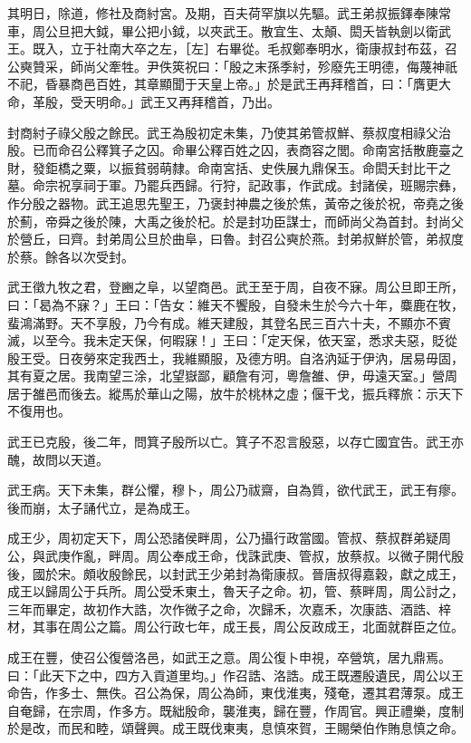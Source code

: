 \begin{pinyinscope}
其明日，除道，修社及商紂宮。及期，百夫荷罕旗以先驅。武王弟叔振鐸奉陳常車，周公旦把大鉞，畢公把小鉞，以夾武王。散宜生、太顛、閎夭皆執劍以衛武王。既入，立于社南大卒之左，［左］右畢從。毛叔鄭奉明水，衛康叔封布茲，召公奭贊采，師尚父牽牲。尹佚筴祝曰：「殷之末孫季紂，殄廢先王明德，侮蔑神祇不祀，昏暴商邑百姓，其章顯聞于天皇上帝。」於是武王再拜稽首，曰：「膺更大命，革殷，受天明命。」武王又再拜稽首，乃出。

封商紂子祿父殷之餘民。武王為殷初定未集，乃使其弟管叔鮮、蔡叔度相祿父治殷。已而命召公釋箕子之囚。命畢公釋百姓之囚，表商容之閭。命南宮括散鹿臺之財，發鉅橋之粟，以振貧弱萌隸。命南宮括、史佚展九鼎保玉。命閎夭封比干之墓。命宗祝享祠于軍。乃罷兵西歸。行狩，記政事，作武成。封諸侯，班賜宗彝，作分殷之器物。武王追思先聖王，乃褒封神農之後於焦，黃帝之後於祝，帝堯之後於薊，帝舜之後於陳，大禹之後於杞。於是封功臣謀士，而師尚父為首封。封尚父於營丘，曰齊。封弟周公旦於曲阜，曰魯。封召公奭於燕。封弟叔鮮於管，弟叔度於蔡。餘各以次受封。

武王徵九牧之君，登豳之阜，以望商邑。武王至于周，自夜不寐。周公旦即王所，曰：「曷為不寐？」王曰：「告女：維天不饗殷，自發未生於今六十年，麋鹿在牧，蜚鴻滿野。天不享殷，乃今有成。維天建殷，其登名民三百六十夫，不顯亦不賓滅，以至今。我未定天保，何暇寐！」王曰：「定天保，依天室，悉求夫惡，貶從殷王受。日夜勞來定我西土，我維顯服，及德方明。自洛汭延于伊汭，居易毋固，其有夏之居。我南望三涂，北望嶽鄙，顧詹有河，粵詹雒、伊，毋遠天室。」營周居于雒邑而後去。縱馬於華山之陽，放牛於桃林之虛；偃干戈，振兵釋旅：示天下不復用也。

武王已克殷，後二年，問箕子殷所以亡。箕子不忍言殷惡，以存亡國宜告。武王亦醜，故問以天道。

武王病。天下未集，群公懼，穆卜，周公乃祓齋，自為質，欲代武王，武王有瘳。後而崩，太子誦代立，是為成王。

成王少，周初定天下，周公恐諸侯畔周，公乃攝行政當國。管叔、蔡叔群弟疑周公，與武庚作亂，畔周。周公奉成王命，伐誅武庚、管叔，放蔡叔。以微子開代殷後，國於宋。頗收殷餘民，以封武王少弟封為衛康叔。晉唐叔得嘉穀，獻之成王，成王以歸周公于兵所。周公受禾東土，魯天子之命。初，管、蔡畔周，周公討之，三年而畢定，故初作大誥，次作微子之命，次歸禾，次嘉禾，次康誥、酒誥、梓材，其事在周公之篇。周公行政七年，成王長，周公反政成王，北面就群臣之位。

成王在豐，使召公復營洛邑，如武王之意。周公復卜申視，卒營筑，居九鼎焉。曰：「此天下之中，四方入貢道里均。」作召誥、洛誥。成王既遷殷遺民，周公以王命告，作多士、無佚。召公為保，周公為師，東伐淮夷，殘奄，遷其君薄泵。成王自奄歸，在宗周，作多方。既絀殷命，襲淮夷，歸在豐，作周官。興正禮樂，度制於是改，而民和睦，頌聲興。成王既伐東夷，息慎來賀，王賜榮伯作賄息慎之命。


\end{pinyinscope}
